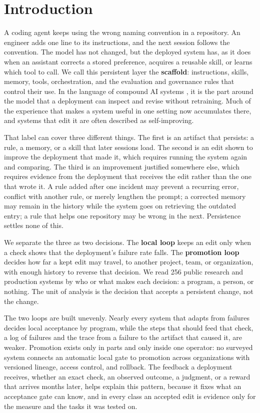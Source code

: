 \section{Introduction}\label{sec:intro}

A coding agent keeps using the wrong naming convention in a repository. An engineer adds one line to its instructions, and the next session follows the convention. The model has not changed, but the deployed system has, as it does when an assistant corrects a stored preference, acquires a reusable skill, or learns which tool to call. We call this persistent layer the \textbf{scaffold}: instructions, skills, memory, tools, orchestration, and the evaluation and governance rules that control their use. In the language of compound AI systems \citep{zaharia2024compound}, it is the part around the model that a deployment can inspect and revise without retraining. Much of the experience that makes a system useful in one setting now accumulates there, and systems that edit it are often described as self-improving.

That label can cover three different things. The first is an artifact that persists: a rule, a memory, or a skill that later sessions load. The second is an edit shown to improve the deployment that made it, which requires running the system again and comparing. The third is an improvement justified somewhere else, which requires evidence from the deployment that receives the edit rather than the one that wrote it. A rule added after one incident may prevent a recurring error, conflict with another rule, or merely lengthen the prompt; a corrected memory may remain in the history while the system goes on retrieving the outdated entry; a rule that helps one repository may be wrong in the next. Persistence settles none of this.

We separate the three as two decisions. The \textbf{local loop} keeps an edit only when a check shows that the deployment's failure rate falls. The \textbf{promotion loop} decides how far a kept edit may travel, to another project, team, or organization, with enough history to reverse that decision. We read 256 public research and production systems by who or what makes each decision: a program, a person, or nothing. The unit of analysis is the decision that accepts a persistent change, not the change.

The two loops are built unevenly. Nearly every system that adapts from failures decides local acceptance by program, while the steps that should feed that check, a log of failures and the trace from a failure to the artifact that caused it, are weaker. Promotion exists only in parts and only inside one operator: no surveyed system connects an automatic local gate to promotion across organizations with versioned lineage, access control, and rollback. The feedback a deployment receives, whether an exact check, an observed outcome, a judgment, or a reward that arrives months later, helps explain this pattern, because it fixes what an acceptance gate can know, and in every class an accepted edit is evidence only for the measure and the tasks it was tested on.


